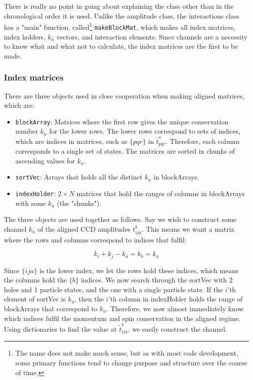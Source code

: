 \documentclass[10pt,twoside]{report}
\begin{document}
	There is really no point in going about explaining the class other than in the chronological order it is used. Unlike the amplitude class, the interactions class has a "main" function, called\footnote{The name does not make much sense, but as with most code development, some primary functions tend to change purpose and structure over the course of time.} \texttt{makeBlockMat}, which makes all index matrices, index holders, $k_u$ vectors, and interaction elements. Since channels are a necessity to know what and what not to calculate, the index matrices are the first to be made.
	
	\subsubsection{Index matrices}
	There are three objects used in close cooperation when making aligned matrices, which are:
	
	\begin{itemize}
		\item \texttt{blockArray}: Matrices where the first row gives the unique conservation number $k_u$ for the lower rows. The lower rows correspond to sets of indices, which are indices in matrices, such as $\{pqr\}$ in $\tilde{t}_{pqr}^s$. Therefore, each column corresponds to a single set of states. The matrices are sorted in chunks of ascending values for $k_u$.
		\item \texttt{sortVec}: Arrays that holds all the distinct $k_u$ in blockArrays.
		\item \texttt{indexHolder}: $2\times N$ matrices that hold the ranges of columns in blockArrays with some $k_u$ (the "chunks").
	\end{itemize}
	
	The three objects are used together as follows. Say we wish to construct some channel $k_u$ of the aligned CCD amplitudes $t_{ija}^b$. This means we want a matrix where the rows and columns correspond to indices that fulfil:
	
	\begin{equation}
	k_i+k_j-k_a = k_b = k_u
	\end{equation}
	
	Since $\{ija\}$ is the lower index, we let the rows hold these indices, which means the columns hold the $\{b\}$ indices. We now search through the sortVec with 2 holes and 1 particle states, and the one with a single particle state. If the $i$'th element of sortVec is $k_u$, then the $i$'th column in indexHolder holds the range of blockArrays that correspond to $k_u$. Therefore, we now almost immediately know which indices fulfil the momentum and spin conservation in the aligned regime. Using dictionaries to find the value at $\tilde{t}_{ija}^b$, we easily construct the channel.
	
\end{document}
